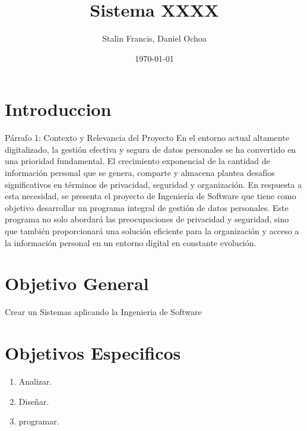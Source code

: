 \documentclass[11pt]{article}
\title{ Sistema XXXX}
\author{ Stalin Francis, Daniel Ochoa }
\date{\today}
\begin{document}
\maketitle	
\section{Introduccion}

Párrafo 1: Contexto y Relevancia del Proyecto
En el entorno actual altamente digitalizado, la gestión efectiva y segura de datos personales se ha convertido en una prioridad fundamental. El crecimiento exponencial de la cantidad de información personal que se genera, comparte y almacena plantea desafíos significativos en términos de privacidad, seguridad y organización. En respuesta a esta necesidad, se presenta el proyecto de Ingeniería de Software que tiene como objetivo desarrollar un programa integral de gestión de datos personales. Este programa no solo abordará las preocupaciones de privacidad y seguridad, sino que también proporcionará una solución eficiente para la organización y acceso a la información personal en un entorno digital en constante evolución.
\section{Objetivo General}
Crear un Sistemas aplicando la Ingenieria de Software

\section{Objetivos Especificos}
\begin{enumerate}
\item Analizar.
\item Diseñar.
\item programar.

\end{enumerate}
\end{document}
